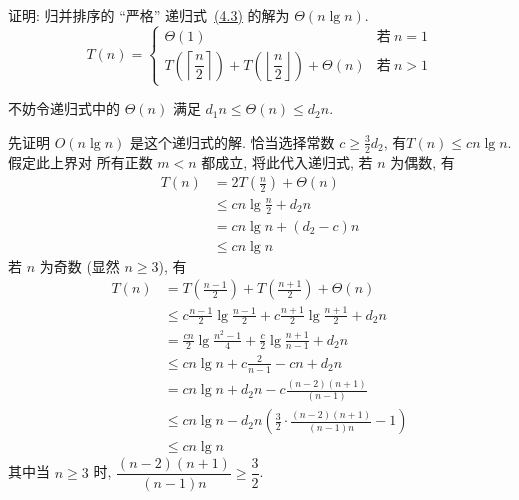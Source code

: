 \documentclass[boxes]{homework}
\begin{document}
\begin{problem}
证明: 归并排序的 ``严格'' 递归式~\hyperref[eq:4.3-5.1]{(4.3)} 的解为 $\Theta(n
    \lg n)$.
\begin{equation}
    \label{eq:4.3-5.1}
    T(n) =
    \begin{cases}
        \Theta(1) & \text{若}\ n = 1 \\
        T \left( \left\lceil \dfrac{n}{2} \right\rceil \right) + T \left(
        \left\lfloor \dfrac{n}{2} \right\rfloor \right) + \Theta(n)
                  & \text{若}\ n > 1
    \end{cases}
\end{equation}
\end{problem}
\begin{solution}
    不妨令递归式中的 $\Theta(n)$ 满足 $d_{1}n \leqslant \Theta(n)
        \leqslant d_{2}n$.

    先证明 $O(n\lg n)$ 是这个递归式的解. 恰当选择常数
    $c \geqslant \frac{ 3 }{ 2 }d_{2}$, 有$T(n) \leqslant cn\lg n$. 假定此上界对
    所有正数 $m < n$ 都成立, 将此代入递归式, 若 $n$ 为偶数, 有
    \begin{equation}
        \begin{aligned}
            T(n)
             & = 2T \left( \frac{ n }{ 2 }\right) + \Theta(n) \\
             & \leqslant cn\lg \frac{ n }{ 2 } + d_{2}n       \\
             & = cn\lg n + \left( d_{2} - c\right)n           \\
             & \leqslant cn\lg n
        \end{aligned}
    \end{equation}
    若 $n$ 为奇数 (显然 $n \geqslant 3$), 有
    \begin{equation}
        \begin{aligned}
            T(n)
             & = T \left( \frac{ n - 1 }{ 2 }\right) +
            T \left( \frac{ n + 1 }{ 2 }\right) + \Theta(n)                \\
             & \leqslant c \frac{ n - 1 }{ 2 } \lg \frac{ n - 1 }{ 2 } +
            c \frac{ n + 1 }{ 2 } \lg \frac{ n + 1 }{ 2 } + d_{2} n        \\
             & = \frac{ cn }{ 2 } \lg \frac{ n^{2} - 1 }{ 4 } +
            \frac{ c }{ 2 }\lg \frac{ n + 1 }{ n - 1 } + d_{2}n            \\
             & \leqslant cn \lg n + c \frac{ 2 }{ n - 1 } - cn + d_{2}n    \\
             & = cn \lg n + d_{2} n - c \frac{ (n - 2)(n + 1) }{ (n - 1) } \\
             & \leqslant cn \lg n - d_{2}n \left( \frac{ 3 }{ 2 } \cdot
            \frac{ (n - 2)(n + 1) }{ (n - 1)n } - 1\right)                 \\
             & \leqslant cn \lg n
        \end{aligned}
    \end{equation}
    其中当 $n \geqslant 3$ 时,
    $\dfrac{ (n - 2)(n + 1) }{ (n - 1)n } \geqslant \dfrac{ 3 }{ 2 }$.


\end{solution}
\end{document}
